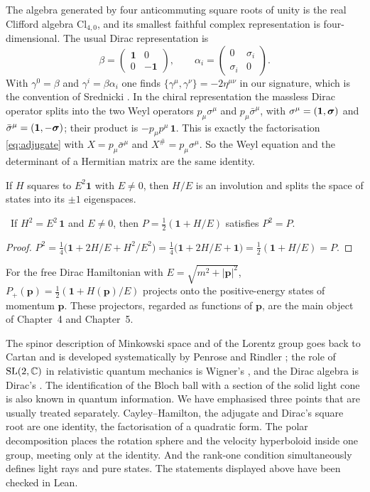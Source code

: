 The algebra generated by four anticommuting square roots of unity is the real Clifford algebra $\mathrm{Cl}_{4,0}$, and its smallest faithful complex representation is four-dimensional. The usual Dirac representation is
\[
\beta=\begin{pmatrix}\mathbf 1&0\\0&-\mathbf 1\end{pmatrix},\qquad \alpha_i=\begin{pmatrix}0&\sigma_i\\ \sigma_i&0\end{pmatrix}.
\]
With $\gamma^0=\beta$ and $\gamma^i=\beta\alpha_i$ one finds $\{\gamma^\mu,\gamma^\nu\}=-2\eta^{\mu\nu}$ in our signature, which is the convention of Srednicki \cite{Srednicki}. In the chiral representation the massless Dirac operator splits into the two Weyl operators $p_\mu\sigma^\mu$ and $p_\mu\bar\sigma^\mu$, with $\sigma^\mu=(\mathbf 1,\boldsymbol{\sigma})$ and $\bar\sigma^\mu=(\mathbf 1,-\boldsymbol{\sigma})$; their product is $-p_\mu p^\mu\,\mathbf 1$. This is exactly the factorisation \eqref{eq:adjugate} with $X=p_\mu\bar\sigma^\mu$ and $X^\#=p_\mu\sigma^\mu$. So the Weyl equation and the determinant of a Hermitian matrix are the same identity.

If $H$ squares to $E^2\mathbf 1$ with $E\neq0$, then $H/E$ is an involution and splits the space of states into its $\pm1$ eigenspaces.

\begin{theorem}\label{thm:projidem}\ver\
If $H^2=E^2\,\mathbf 1$ and $E\neq0$, then $P=\tfrac12(\mathbf 1+H/E)$ satisfies $P^2=P$.
\end{theorem}
\begin{proof}
$P^2=\tfrac14\bigl(\mathbf 1+2H/E+H^2/E^2\bigr)=\tfrac14\bigl(\mathbf 1+2H/E+\mathbf 1\bigr)=\tfrac12(\mathbf 1+H/E)=P$.
\end{proof}


For the free Dirac Hamiltonian with $E=\sqrt{m^2+|\mathbf p|^2}$, $P_+(\mathbf p)=\tfrac12(\mathbf 1+H(\mathbf p)/E)$ projects onto the positive-energy states of momentum $\mathbf p$. These projectors, regarded as functions of $\mathbf p$, are the main object of Chapter~4 and Chapter~5.

\begin{litbox}
The spinor description of Minkowski space and of the Lorentz group goes back to Cartan and is developed systematically by Penrose and Rindler \cite{PenroseRindler1}; the role of $\mathrm{SL}(2,\mathbb{C})$ in relativistic quantum mechanics is Wigner's \cite{Wigner1939}, and the Dirac algebra is Dirac's \cite{Dirac1928}. The identification of the Bloch ball with a section of the solid light cone is also known in quantum information. We have emphasised three points that are usually treated separately. Cayley--Hamilton, the adjugate and Dirac's square root are one identity, the factorisation of a quadratic form. The polar decomposition places the rotation sphere and the velocity hyperboloid inside one group, meeting only at the identity. And the rank-one condition simultaneously defines light rays and pure states. The statements displayed above have been checked in Lean.
\end{litbox}

